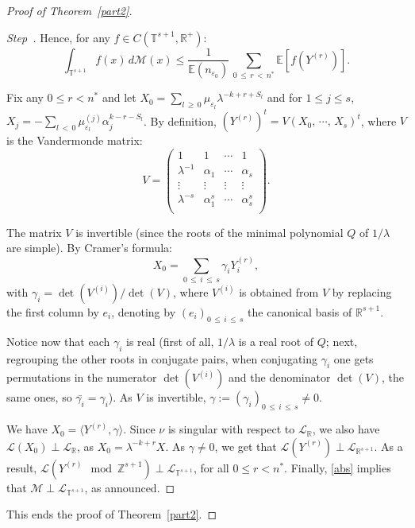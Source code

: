 \documentclass[10pt]{amsart}
\theoremstyle{definition}\newtheorem{defi}[theo]{Definition}\newtheorem{rema}[theo]{Remark}\newtheorem{exam}[theo]{Example}\newtheorem{exem}[theo]{Example}\newtheorem{nota}[theo]{Notation}
\newcommand{\Ebb}{\mathbb E}
\newcommand{\Tbb}{\mathbb T}
\newcommand{\Rbb}{\mathbb R}
\newcommand{\Zbb}{\mathbb Z}
\newcommand{\Lcl}{\mathcal{L}}
\newcommand{\Mcl}{\mathcal{M}}
\newcounter{stepcount}
\newenvironment{step}{\refstepcounter{stepcount}\begin{proof}[Step~\thestepcount]}{\let\qed\relax\end{proof}}
\begin{document}
\begin{proof}[{Proof of Theorem~\ref{part2}}]
\begin{step}
Hence, for any $f\in C(\Tbb^{s+1},\Rbb^+)$:
\begin{equation}\label{abs}
\int_{\Tbb^{s+1}}f(x)\,d{\Mcl}(x)\leq\frac{1}{\Ebb(n_{\varepsilon_0})}\,\sum_{0\,\leq\,r\,<\,n^*}\Ebb\left[{f\left(Y^{(r)}\right)}\right].
\end{equation}


Fix any $0\leq r<n^*$ and let $X_0=\sum_{l\,\geq\,0}\mu_{\varepsilon_l}\lambda^{-k+r+S_l}$ and for $1\leq j\leq s$, $X_j=-\sum_{l\,<\,0}\mu^{(j)}_{\varepsilon_l}\alpha_j^{k-r-S_l}$. By definition, $(Y^{(r)})^t=V(X_0,\,\cdots,\,X_s)^t$, where $V$ is the Vandermonde matrix:
\[
V=\left(
\begin{matrix}
1&1&\cdots&1\\
\lambda^{-1}&\alpha_1&\cdots&\alpha_s\\
\vdots&\vdots&\vdots&\vdots\\
\lambda^{-s}&\alpha_1^s&\cdots&\alpha_s^s\\
\end{matrix}\right).
\]



The matrix $V$ is invertible (since the roots of the minimal polynomial $Q$ of $1/\lambda$ are simple). By Cramer's formula:
\[
X_0=\sum_{0\,\leq\,i\,\leq\,s}\gamma_iY_i^{(r)},
\]
with $\gamma_i=\det(V^{(i)})/\det(V)$, where $V^{(i)}$ is obtained from $V$ by replacing the first column by $e_i$, denoting by $(e_i)_{0\,\leq\, i\,\leq\,s}$ the canonical basis of $\Rbb^{s+1}$.


Notice now that each $\gamma_i$ is real (first of all, $1/\lambda$ is a real root of $Q$; next, regrouping the other roots in conjugate pairs, when conjugating $\gamma_i$ one gets permutations in the numerator $\det(V^{(i)})$ and the denominator $\det(V)$, the same ones, so $\bar{\gamma_i}=\gamma_i$). As $V$ is invertible, $\gamma:=(\gamma_i)_{0\,\leq\,i\,\leq\,s}\not=0$.




 We have $X_0=\langle Y^{(r)},\gamma\rangle$. Since $\nu$ is singular with respect to ${\Lcl}_{\Rbb}$, we also have ${\Lcl}(X_0)\perp {\Lcl}_{\Rbb}$, as $X_0=\lambda^{-k+r}X$. As $\gamma\not=0$, we get that ${\Lcl}(Y^{(r)})\perp {\Lcl}_{\Rbb^{s+1}}$. As a result, ${\Lcl}(Y^{(r)}\mod\Zbb^{s+1})\perp {\Lcl}_{\Tbb^{s+1}}$, for all $0\leq r<n^*$. Finally, \eqref{abs} implies that ${\Mcl}\perp {\Lcl}_{\Tbb^{s+1}}$, as announced.
\end{step}

This ends the proof of Theorem~\ref{part2}.
\end{proof}
\end{document}
